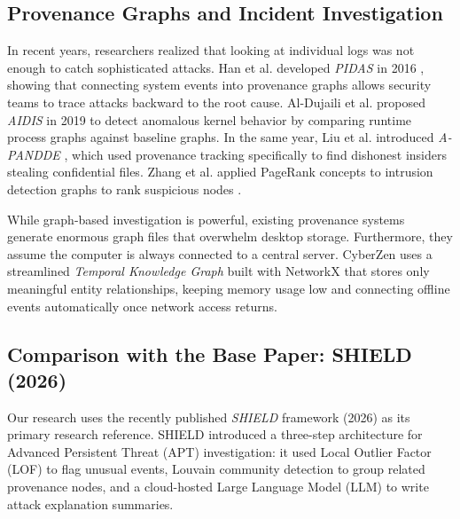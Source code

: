 \documentclass[conference]{IEEEtran}
\begin{document}
\subsection{Provenance Graphs and Incident Investigation}
In recent years, researchers realized that looking at individual logs was not enough to catch sophisticated attacks. Han et al. developed \textit{PIDAS} in 2016 \cite{han2016pidas}, showing that connecting system events into provenance graphs allows security teams to trace attacks backward to the root cause. Al-Dujaili et al. proposed \textit{AIDIS} in 2019 \cite{aldujaili2019aidis} to detect anomalous kernel behavior by comparing runtime process graphs against baseline graphs. In the same year, Liu et al. introduced \textit{A-PANDDE} \cite{liu2019apandde}, which used provenance tracking specifically to find dishonest insiders stealing confidential files. Zhang et al. applied PageRank concepts to intrusion detection graphs to rank suspicious nodes \cite{zhang2013pagerank}.

While graph-based investigation is powerful, existing provenance systems generate enormous graph files that overwhelm desktop storage. Furthermore, they assume the computer is always connected to a central server. CyberZen uses a streamlined \textit{Temporal Knowledge Graph} built with NetworkX that stores only meaningful entity relationships, keeping memory usage low and connecting offline events automatically once network access returns.

\subsection{Comparison with the Base Paper: SHIELD (2026)}
Our research uses the recently published \textit{SHIELD} framework \cite{shield2026provenance} (2026) as its primary research reference. SHIELD introduced a three-step architecture for Advanced Persistent Threat (APT) investigation: it used Local Outlier Factor (LOF) to flag unusual events, Louvain community detection to group related provenance nodes, and a cloud-hosted Large Language Model (LLM) to write attack explanation summaries.
\end{document}
